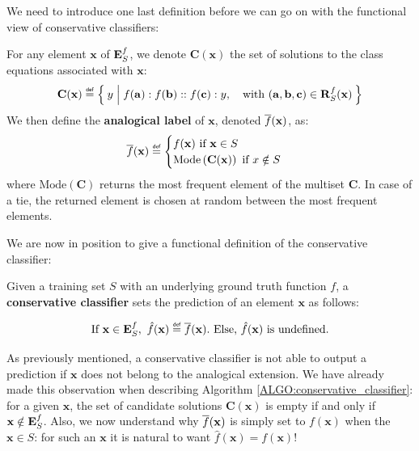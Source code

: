 We need to introduce one last definition before we can go on with the
functional view of conservative classifiers:

\begin{definition}
  \label{DEF:analogical_label}
  For any element $\mathbf{x}$ of $\mathbf{E}_{S}^{f}$, we denote $\mathbf{C}(\mathbf{x})$
  the set of solutions to the class equations associated with $\mathbf{x}$:
  $$\mathbf{C}(\mathbf{x}) \eqdef \Set{y | f(\mathbf{a}) : f(\mathbf{b}) ::
  f(\mathbf{c}) :y, \quad \text{with }(\mathbf{a}, \mathbf{b}, \mathbf{c}) \in \rsfx}$$
  We then define the \textbf{analogical
  label} of $\mathbf{x}$, denoted $\overline{f}(\mathbf{x})$, as:
  $$\albl{\mathbf{x}} \eqdef
  \begin{cases}
    f(\mathbf{x}) \text{ if } \mathbf{x} \in S\\
    \text{Mode} \left(\mathbf{C}(\mathbf{x})\right) \text{ if
    } x \notin S
  \end{cases}
  $$
  where $\text{Mode}(\mathbf{C})$ returns the most frequent element of the multiset
$\mathbf{C}$. In case of a tie, the returned element is chosen at random between
the most frequent elements.
\end{definition}

\noindent
We are now in position to give a functional definition of the conservative
classifier:

\begin{definition}
  \label{DEF:conservative_classifier}
  Given a training set $S$ with an underlying ground truth function $f$,
  a \textbf{conservative classifier} sets the prediction of an element $\mathbf{x}$ as
  follows:

  $$\text{If } \mathbf{x} \in \esf, ~ \hat{f}(\mathbf{x}) \eqdef \albl{\mathbf{x}}.
  \text{ Else, } \hat{f}(\mathbf{x}) \text{ is undefined.}$$
\end{definition}

As previously mentioned, a conservative classifier is not able to output a
prediction if $\mathbf{x}$ does not belong to the analogical extension. We have
already made this observation when describing Algorithm
\ref{ALGO:conservative_classifier}: for a given $\mathbf{x}$, the set of
candidate solutions $\mathbf{C}(\mathbf{x})$ is empty if and only if
$\mathbf{x} \notin \mathbf{E}_{S}^{f}$.  Also, we now understand why $\overline{f}(\mathbf{x})$ is
simply set to $f(\mathbf{x})$ when the $\mathbf{x} \in S$: for such an
$\mathbf{x}$ it is natural to want $\hat{f}(\mathbf{x}) = f(\mathbf{x})$!


